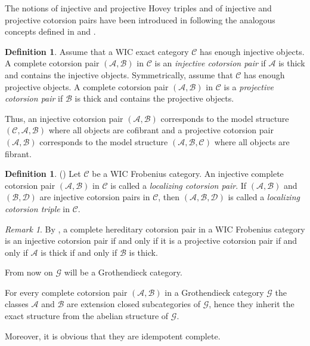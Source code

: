 \documentclass[11pt,a4paper,reqno]{amsart}
\newcommand{\A}{\mathcal{A}}
\newcommand{\B}{\mathcal{B}}
\newcommand{\C}{\mathcal{C}}
\newcommand{\D}{\mathcal{D}}
\newcommand{\G}{\mathcal{G}}
\theoremstyle{plain}
\theoremstyle{definition}
\newtheorem{defn}[thm]{Definition}
\theoremstyle{remark}
\newtheorem{rem}[thm]{Remark}
\begin{document}
The notions of injective and projective Hovey triples and of injective and projective cotorsion pairs have been introduced in \cite{G7} following the analogous concepts defined in \cite{Beck14} and \cite{G6}.



%
\begin{defn}  Assume that a WIC exact category $\C$ has enough injective objects.
%
A complete cotorsion pair $(\A, \B)$ in $\C$ is an \emph{injective cotorsion pair} if $\A$ is thick and contains the injective objects.
Symmetrically, assume that $\C$ has enough projective objects.
%
A complete cotorsion pair $(\A, \B)$ in $\C$ is a \emph{projective cotorsion pair} if $\B$ is thick and contains the projective objects.


\end{defn}
%
Thus, an injective cotorsion pair $(\A, \B)$ corresponds to the model structure $(\C, \A, \B)$ where all objects are cofibrant and a projective cotorsion pair $(\A, \B)$ corresponds to the model structure $ (\A, \B, \C)$ where all objects are fibrant.

%
%

\begin{defn} (\cite[Definition 4.3]{G7}) Let $\C$ be a WIC Frobenius category.
An injective complete cotorsion pair $(\A, \B)$ in $\C$ is called a \emph{localizing cotorsion pair}. If $(\A, \B)$ and $(\B, \D)$ are injective cotorsion pairs in $\C$, then $(\A, \B, \D)$ is called a \emph{localizing cotorsion triple} in $\C$.
\end{defn}

\begin{rem}\label{R:inj-proj-model} By \cite[Proposition 4.2]{G7}, a complete hereditary cotorsion pair  in a WIC Frobenius category is an injective cotorsion pair if and only if it is a projective cotorsion pair if and only if $\A$ is thick if and only if $\B$ is thick.

%
%
%
%
\end{rem}

%
%
%
%
%
%
%


%

%
From now on $\G$ will be a Grothendieck category.

For every complete cotorsion pair $(\A, \B)$ in a Grothendieck category $\G$ the classes $\A$ and $\B$ are extension closed subcategories of $\G$, hence they inherit the exact structure from the abelian structure of $\G$.

Moreover, it is obvious that they are idempotent complete.
\end{document}
